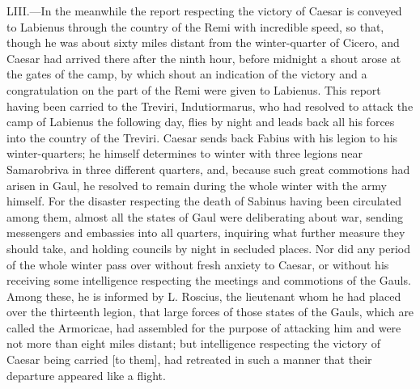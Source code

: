 LIII.—In the meanwhile the report respecting the victory of Caesar is
conveyed to Labienus through the country of the Remi with incredible
speed, so that, though he was about sixty miles distant from the
winter-quarter of Cicero, and Caesar had arrived there after the ninth
hour, before midnight a shout arose at the gates of the camp, by which
shout an indication of the victory and a congratulation on the part of
the Remi were given to Labienus. This report having been carried to the
Treviri, Indutiormarus, who had resolved to attack the camp of Labienus
the following day, flies by night and leads back all his forces into the
country of the Treviri. Caesar sends back Fabius with his legion to his
winter-quarters; he himself determines to winter with three legions near
Samarobriva in three different quarters, and, because such great
commotions had arisen in Gaul, he resolved to remain during the whole
winter with the army himself. For the disaster respecting the death of
Sabinus having been circulated among them, almost all the states of Gaul
were deliberating about war, sending messengers and embassies into all
quarters, inquiring what further measure they should take, and holding
councils by night in secluded places. Nor did any period of the whole
winter pass over without fresh anxiety to Caesar, or without his
receiving some intelligence respecting the meetings and commotions of
the Gauls. Among these, he is informed by L. Roscius, the lieutenant
whom he had placed over the thirteenth legion, that large forces of
those states of the Gauls, which are called the Armoricae, had assembled
for the purpose of attacking him and were not more than eight miles
distant; but intelligence respecting the victory of Caesar being carried
[to them], had retreated in such a manner that their departure appeared
like a flight.

